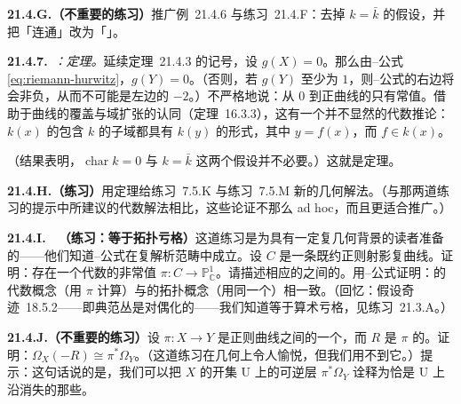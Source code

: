 \textbf{21.4.G.（不重要的练习）}\quad 推广\mbox{例~21.4.6} 与\mbox{练习~21.4.F}：去掉 $k=\bar{k}$ 的假设，并把「连通」改为「\trGeometricallyConnected」。

\textbf{21.4.7.}\ \emph{\trhExample{}：\trLuroth{}定理。}\quad 延续\mbox{定理~21.4.3} 的记号，设 $g(X)=0$。那么由\trRiemann--\trHurwitz{}公式 \eqref{eq:riemann-hurwitz}，$g(Y)=0$。（否则，若 $g(Y)$ 至少为 $1$，则\trRiemann--\trHurwitz{}公式的右边将会非负，从而不可能是左边的 $-2$。）不严格地说：从\trGenus{} $0$ \trCurve{}到正\trGenus{}曲线的\trMap{}只有常值\trMap。借助于曲线的覆盖与域扩张的认同（\mbox{定理~16.3.3}），这有一个并不显然的代数推论：$k(x)$ 的包含 $k$ 的子域都具有 $k(y)$ 的形式，其中 $y=f(x)$，而 $f\in k(x)$。


（结果表明，$\operatorname{char}k=0$ 与 $k=\bar{k}$ 这两个假设并不必要。）这就是\trLuroth{}定理。

\textbf{21.4.H.（练习）}\quad 用\trLuroth{}定理给\mbox{练习~7.5.K} 与\mbox{练习~7.5.M} 新的几何解法。（与那两道练习的提示中所建议的代数解法相比，这些论证不那么 ad hoc，而且更适合推广。）

\textbf{21.4.I.}\ \hard\ \textbf{（练习：\trGeometricGenus{}等于拓扑亏格）}\quad 这道练习是为具有一定复几何背景的读者准备的——他们知道\trRiemann--\trHurwitz{}公式在复解析范畴中成立。设 $C$ 是一条既约正则射影复曲线。证明：存在一个代数的非常值\trMap{} $\pi\colon C\to\mathbb{P}^1_{\mathbb{C}}$。请描述相应的\trRiemannSurface{}之间的\trMap。用\trRiemann--\trHurwitz{}公式证明：\trGenus{}的代数概念（用\trBranchedCover{} $\pi$ 计算）与\trGenus{}的拓扑概念（用同一个\trBranchedCover）相一致。（回忆：假设\mbox{奇迹~18.5.2}——即典范丛是\trSerre{}对偶化的——我们知道\trGeometricGenus{}等于算术亏格，见\mbox{练习~21.3.A}。）

\textbf{21.4.J.（不重要的练习）}\quad 设 $\pi\colon X\to Y$ 是正则曲线之间的一个\trDominant{}\trMorphism，而 $R$ 是 $\pi$ 的\trRamificationDivisor。证明：$\Omega_X(-R)\cong\pi^*\Omega_Y$。（这道练习在几何上令人愉悦，但我们用不到它。）提示：这句话说的是，我们可以把 $X$ 的开集 $\mathrm{U}$ 上的可逆层 $\pi^*\Omega_Y$ 诠释为恰是 $\mathrm{U}$ 上沿\trRamificationDivisor{}消失的那些\trDifferential。

